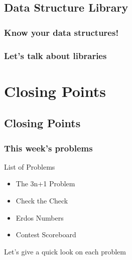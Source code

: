 \documentclass{beamer}
\begin{document}
\subsection{Data Structure Library}

\begin{frame}
  \frametitle{Know your data structures!}
\end{frame}

\begin{frame}
  \frametitle{Let's talk about libraries}
\end{frame}









\section{Closing Points}
\subsection{Closing Points}
\begin{frame}
  \frametitle{This week's problems}
  \begin{block}{List of Problems}
    \begin{itemize}
    \item The 3n+1 Problem
    \item Check the Check
    \item Erdos Numbers
    \item Contest Scoreboard
    \end{itemize}
  \end{block}
  \medskip
  Let's give a quick look on each problem
\end{frame}
\end{document}
